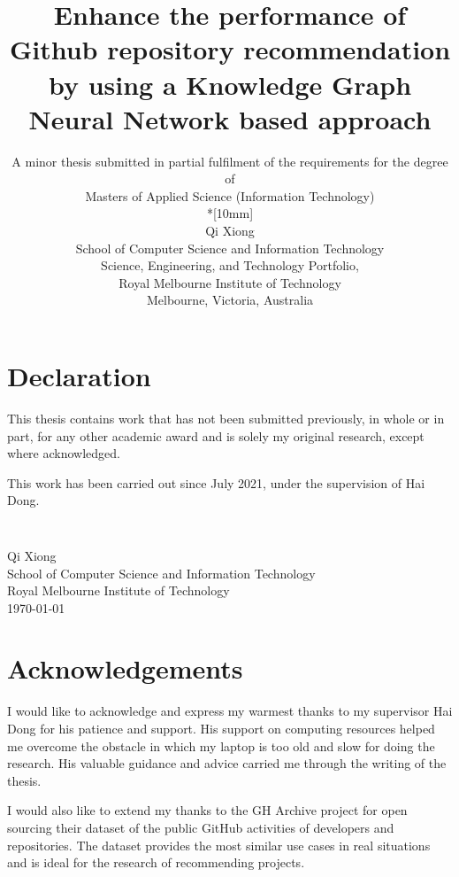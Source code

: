 \documentclass[11pt,twoside]{report}
\newcommand{\SubmissionDate}{\today}
\newcommand{\student}{Qi Xiong}
\newcommand{\supervisor}{Hai Dong}
\newcommand{\topic}{Enhance the performance of Github repository recommendation by using a Knowledge Graph Neural Network based approach}
\newcommand{\school}{School of Computer Science and Information Technology}
\newcommand{\program}{Masters of Applied Science (Information Technology)}
\newcommand{\institution}{Royal Melbourne Institute of Technology}
\begin{document}
\title{{\Large\bf \topic}}
\author{
A minor thesis submitted in partial fulfilment of the requirements for the degree of
\\\program\\*[10mm]
\\\student
\\\school
\\Science, Engineering, and Technology Portfolio,
\\\institution
\\Melbourne, Victoria, Australia
}
\maketitle
\thispagestyle{empty}

\chapter*{Declaration}

This thesis contains work that has not been submitted previously, in
whole or in part, for any other academic award and is solely my
original research, except where acknowledged.

This work has been carried out since July 2021, under the
supervision of {\supervisor}.

\paragraph{}
\vspace{5cm}\noindent \\\student \\
\school\\
\institution\\
\SubmissionDate


\chapter*{Acknowledgements}

I would like to acknowledge and express my warmest thanks to my supervisor Hai Dong for his patience and support. His support on computing resources helped me overcome the obstacle in which my laptop is too old and slow for doing the research. His valuable guidance and advice carried me through the writing of the thesis.

I would also like to extend my thanks to the GH Archive project for open sourcing their dataset of the public GitHub activities of developers and repositories. The dataset provides the most similar use cases in real situations and is ideal for the research of recommending projects.
\end{document}
